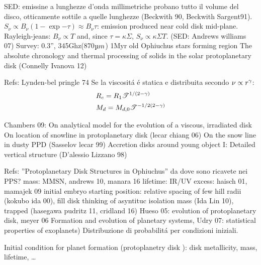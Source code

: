 \begin{workout}
\begin{workout}
\end{workout}

\begin{workout}
SED: emissine a lunghezze d'onda millimetriche probano tutto il volume del disco, otticamente sottile a quelle lunghezze (Beckwith 90, Beckwith Sargent91).
$S_{\nu}\propto B_{\nu}(1-\exp{-\tau})\approx B_{\nu}\tau$: emission produced near cold disk mid-plane.
Rayleigh-jeans: $B_{\nu}\propto T$ and, since $\tau=\kappa\Sigma$, $S_{\nu}\propto \kappa\Sigma T$.
(SED: Andrews williams 07)
Survey: 0.3'', 345Ghz(870$\micro m$) 1Myr old Ophiuchus stars forming region
The absolute chronology and thermal processing of solids in the solar protoplanetary disk (Connelly Ivanova 12)
\end{workout}

\begin{workout}
Refs: Lynden-bel pringle 74
Se la viscosit\'a \'e statica e distribuita secondo $\nu\propto r^{\gamma}$:
\begin{align}
&R_c=R_1\mathcal{T}^{1/(2-\gamma)}\\
&M_d=M_{d,0}\mathcal{T}^{-1/2(2-\gamma)}\\
\end{align}
\end{workout}

\begin{workout}
Chambers 09: On analytical model for the evolution of a viscous, irradiated disk
On location of snowline in protoplanetary disk (lecar chiang 06)
On the snow line in dusty PPD (Sasselov lecar 99)
Accretion disks around young object I: Detailed vertical structure (D'alessio Lizzano 98)
\end{workout}

\begin{workout}
Refs: ''Protoplanetary Disk Structures in Ophiuchus''
da dove sono ricavete nei PPS?
mass: MMSN, andrews 10, manara 16
lifetime: IR/UV excess: haisch 01, mamajek 09
initial embryo starting position: relative spacing of few hill radii (kokubo ida 00), fill disk thinking of asyntituc isolation mass (Ida Lin 10), trapped (hasegawa pudritz 11, cridland 16)
Hueso 05: evolution of protoplanetary disk, meyer 06 Formation and evolution of planetary systems, Udry 07: statistical properties of exoplanets)
Distribuzione di probabilit\'a per condizioni iniziali.

Initial condition for planet formation (protoplanetry disk \cite{meyer2006formation}): disk metallicity, mass, lifetime, \ldots


\end{workout}
\end{workout}
